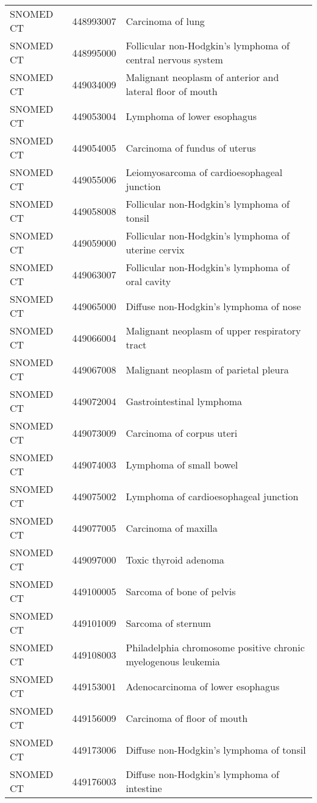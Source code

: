 \begin{longtable}{p{}p{}p{}}
  SNOMED CT & 448993007 & Carcinoma of lung \\ 
  SNOMED CT & 448995000 & Follicular non-Hodgkin's lymphoma of central nervous system \\ 
  SNOMED CT & 449034009 & Malignant neoplasm of anterior and lateral floor of mouth \\ 
  SNOMED CT & 449053004 & Lymphoma of lower esophagus \\ 
  SNOMED CT & 449054005 & Carcinoma of fundus of uterus \\ 
  SNOMED CT & 449055006 & Leiomyosarcoma of cardioesophageal junction \\ 
  SNOMED CT & 449058008 & Follicular non-Hodgkin's lymphoma of tonsil \\ 
  SNOMED CT & 449059000 & Follicular non-Hodgkin's lymphoma of uterine cervix \\ 
  SNOMED CT & 449063007 & Follicular non-Hodgkin's lymphoma of oral cavity \\ 
  SNOMED CT & 449065000 & Diffuse non-Hodgkin's lymphoma of nose \\ 
  SNOMED CT & 449066004 & Malignant neoplasm of upper respiratory tract \\ 
  SNOMED CT & 449067008 & Malignant neoplasm of parietal pleura \\ 
  SNOMED CT & 449072004 & Gastrointestinal lymphoma \\ 
  SNOMED CT & 449073009 & Carcinoma of corpus uteri \\ 
  SNOMED CT & 449074003 & Lymphoma of small bowel \\ 
  SNOMED CT & 449075002 & Lymphoma of cardioesophageal junction \\ 
  SNOMED CT & 449077005 & Carcinoma of maxilla \\ 
  SNOMED CT & 449097000 & Toxic thyroid adenoma \\ 
  SNOMED CT & 449100005 & Sarcoma of bone of pelvis \\ 
  SNOMED CT & 449101009 & Sarcoma of sternum \\ 
  SNOMED CT & 449108003 & Philadelphia chromosome positive chronic myelogenous leukemia \\ 
  SNOMED CT & 449153001 & Adenocarcinoma of lower esophagus \\ 
  SNOMED CT & 449156009 & Carcinoma of floor of mouth \\ 
  SNOMED CT & 449173006 & Diffuse non-Hodgkin's lymphoma of tonsil \\ 
  SNOMED CT & 449176003 & Diffuse non-Hodgkin's lymphoma of intestine \\ 

\end{longtable}
